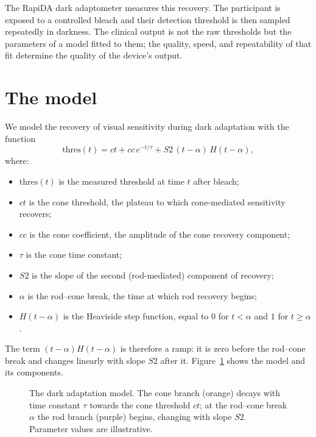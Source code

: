 \documentclass[11pt,a4paper]{article}
\begin{document}
The RapiDA dark adaptometer measures this recovery. The participant is
exposed to a controlled bleach and their detection threshold is then
sampled repeatedly in darkness. The clinical output is not the raw
thresholds but the parameters of a model fitted to them; the quality,
speed, and repeatability of that fit determine the quality of the device's
output.

\section{The model}
We model the recovery of visual sensitivity during dark adaptation with
the function
\begin{equation}
\text{thres}(t) = ct + cc\,e^{-t/\tau} + S2\,(t-\alpha)\,H(t-\alpha),
\label{eq:model}
\end{equation}
where:
\begin{itemize}[nosep]
\item $\text{thres}(t)$ is the measured threshold at time $t$ after bleach;
\item $ct$ is the cone threshold, the plateau to which cone-mediated
  sensitivity recovers;
\item $cc$ is the cone coefficient, the amplitude of the cone recovery
  component;
\item $\tau$ is the cone time constant;
\item $S2$ is the slope of the second (rod-mediated) component of
  recovery;
\item $\alpha$ is the rod--cone break, the time at which rod recovery
  begins;
\item $H(t-\alpha)$ is the Heaviside step function, equal to $0$ for
  $t < \alpha$ and $1$ for $t \geq \alpha$.
\end{itemize}
The term $(t-\alpha)H(t-\alpha)$ is therefore a ramp: it is zero before
the rod--cone break and changes linearly with slope $S2$ after it.
Figure~\ref{fig:model} shows the model and its components.

\begin{figure}[ht]
\centering

\caption{The dark adaptation model. The cone branch (orange) decays with
time constant $\tau$ towards the cone threshold $ct$; at the rod--cone
break $\alpha$ the rod branch (purple) begins, changing with slope $S2$.
Parameter values are illustrative.}
\label{fig:model}
\end{figure}
\end{document}
